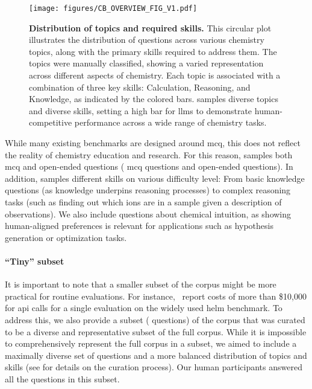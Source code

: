 \documentclass[11pt, oneside]{article}
\begin{document}
\begin{refsection}
\begin{figure}[!htb]
    \centering
    \texttt{[image: figures/CB\_OVERVIEW\_FIG\_V1.pdf]}
    \caption{\textbf{Distribution of topics and required skills.} This circular plot illustrates the distribution of questions across various chemistry topics, along with the primary skills required to address them. The topics were manually classified, showing a varied representation across different aspects of chemistry. Each topic is associated with a combination of three key skills: Calculation, Reasoning, and Knowledge, as indicated by the colored bars. \chembench samples diverse topics and diverse skills, setting a high bar for \glspl{llm} to demonstrate human-competitive performance across a wide range of chemistry tasks.}
    \label{fig:corpus}
\end{figure}


While many existing benchmarks are designed around \gls{mcq}, this does not reflect the reality of chemistry education and research.
For this reason, \chembench samples both \gls{mcq} and open-ended questions ( \gls{mcq} questions and  open-ended questions). In addition, \chembench samples different skills on various difficulty level: From basic knowledge questions (as knowledge underpins reasoning processes\autocite{hu2024towards,bloom1956taxonomy}) to complex reasoning tasks (such as finding out which ions are in a sample given a description of observations). We also include questions about chemical intuition, as showing human-aligned preferences is relevant for applications such as hypothesis generation or optimization tasks.\autocite{zhang2024omniopenendednessmodelshuman}


\paragraph{\enquote{Tiny} subset}
It is important to note that a smaller subset of the corpus might be more practical for routine evaluations.\autocite{polo2024tinybenchmarks}
For instance,~\textcite{liang2023holistic} report costs of more than \$10,000 for \gls{api} calls for a single evaluation on the widely used \gls{helm} benchmark.
To address this, we also provide a subset ( questions) of the corpus that was curated to be a diverse and representative subset of the full corpus. While it is impossible to comprehensively represent the full corpus in a subset, we aimed to include a maximally diverse set of questions and a more balanced distribution of topics and skills (see  for details on the curation process).
Our human participants answered all the questions in this subset.




\end{refsection}
\end{document}
